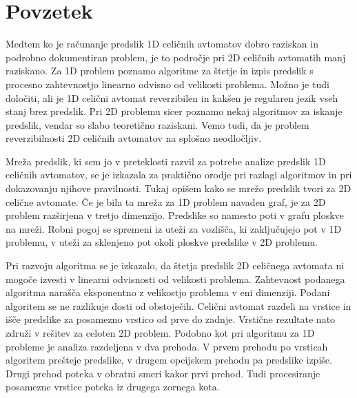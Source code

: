 \documentclass[12pt,a4paper,openany,twoside]{book}
\begin{document}

\clearpage{\pagestyle{empty}\cleardoublepage}


\setcounter{page}{1}

\chapter*{Povzetek}


Medtem ko je računanje predslik 1D celičnih avtomatov dobro raziskan in
podrobno dokumentiran problem, je to področje pri 2D celičnih avtomatih manj raziskano.
Za 1D problem poznamo algoritme za štetje in izpis predslik s
procesno zahtevnostjo linearno odvisno od velikosti problema.
Možno je tudi določiti, ali je 1D celični avtomat reverzibilen in
kakšen je regularen jezik vseh stanj brez predslik.
Pri 2D problemu sicer poznamo nekaj algoritmov za iskanje predslik,
vendar so slabo teoretično raziskani.
Vemo tudi, da je problem reverzibilnosti 2D celičnih avtomatov na splošno neodločljiv.

Mreža predslik, ki sem jo v preteklosti razvil za potrebe analize predslik 1D celičnih avtomatov,
se je izkazala za praktično orodje pri razlagi algoritmov in pri dokazovanju njihove pravilnosti.
Tukaj opišem kako se mrežo predslik tvori za 2D celične avtomate.
Če je bila ta mreža za 1D problem navaden graf, je za 2D problem razširjena v tretjo dimenzijo.
Predslike so namesto poti v grafu ploskve na mreži.
Robni pogoj se spremeni iz uteži za vozlišča, ki zaključujejo pot v 1D problemu,
v uteži za sklenjeno pot okoli ploskve predslike v 2D problemu.

Pri razvoju algoritma se je izkazalo, da štetja predslik 2D celičnega avtomata
ni mogoče izvesti v linearni odvisnosti od velikosti problema.
Zahtevnost podanega algoritma narašča eksponentno z velikostjo problema v eni dimenziji.
Podani algoritem se ne razlikuje dosti od obstoječih.
Celični avtomat razdeli na vrstice in išče predslike za posamezno vrstico od prve do zadnje.
Vrstične rezultate nato združi v rešitev za celoten 2D problem.
Podobno kot pri algoritmu za 1D probleme je analiza razdeljena v dva prehoda.
V prvem prehodu po vrsticah algoritem prešteje predslike,
v drugem opcijskem prehodu pa predslike izpiše.
Drugi prehod poteka v obratni smeri kakor prvi prehod.
Tudi procesiranje posamezne vrstice poteka iz drugega zornega kota.
\end{document}
